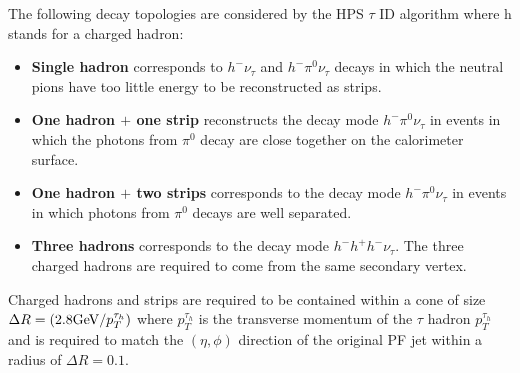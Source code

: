 The following decay topologies are considered by the HPS $\tau$ ID algorithm where
h stands for a charged hadron:
\begin{itemize}
\item{\bf Single hadron}
      corresponds to $ h^{-} \nu_{\tau}$
      and $ h^{-} \pi^{0} \nu_{\tau}$ decays
      in which the neutral pions have too little energy to be reconstructed as strips.
\item{\bf One hadron $+$ one strip}
      reconstructs the decay mode $ h^{-} \pi^{0} \nu_{\tau}$
      in events in which the photons from $\pi^{0}$ decay
      are close together on the calorimeter surface.
\item{\bf One hadron $+$ two strips}
      corresponds to the decay mode $ h^{-} \pi^{0} \nu_{\tau}$
      in events in which photons from $\pi^{0}$ decays are well separated.
\item{\bf Three hadrons}
      corresponds to the decay mode $ h^{-} h^{+} h^{-} \nu_{\tau}$.
      The three charged hadrons are required                                                                                                      
      to come from the same secondary vertex.
\end {itemize}

Charged hadrons and strips are required to be contained within a cone
of size $\Delta R=(2.8\mathrm{GeV}/p_{T}^{\tau_{h}})$ where $p_{T}^{\tau_{h}}$ is 
the transverse momentum of the $\tau$ hadron $p_{T}^{\tau_{h}}$ and is 
required to match the $(\eta,\phi)$ direction of the original PF jet within
a radius of $\Delta R=0.1$. 

